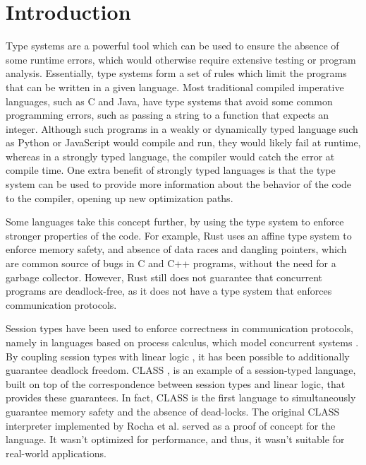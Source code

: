 
\section{Introduction}

Type systems are a powerful tool which can be used to ensure the absence of some runtime errors, which would otherwise require extensive testing or program analysis. Essentially, type systems form a set of rules which limit the programs that can be written in a given language. Most traditional compiled imperative languages, such as C and Java, have type systems that avoid some common programming errors, such as passing a string to a function that expects an integer. Although such programs in a weakly or dynamically typed language such as Python or JavaScript would compile and run, they would likely fail at runtime, whereas in a strongly typed language, the compiler would catch the error at compile time. One extra benefit of strongly typed languages is that the type system can be used to provide more information about the behavior of the code to the compiler, opening up new optimization paths.

Some languages take this concept further, by using the type system to enforce stronger properties of the code. For example, Rust \cite{Matsakis:2014} uses an affine type system to enforce memory safety, and absence of data races and dangling pointers, which are common source of bugs in C and C++ programs, without the need for a garbage collector. However, Rust still does not guarantee that concurrent programs are deadlock-free, as it does not have a type system that enforces communication protocols.


Session types \cite{Honda:1993,Honda:1998} have been used to enforce correctness in communication protocols, namely in languages based on process calculus, which model concurrent systems \cite{Milner:1980,Milner:1992:1,Milner:1992:2}. By coupling session types with linear logic \cite{Girard:1987,Caires:2010}, it has been possible to additionally guarantee deadlock freedom. CLASS \cite{Rocha:2022}, is an example of a session-typed language, built on top of the correspondence between session types and linear logic, that provides these guarantees. In fact, CLASS is the first language to simultaneously guarantee memory safety and the absence of dead-locks. The original CLASS interpreter implemented by Rocha et al. \cite{Rocha:2021:artifact} served as a proof of concept for the language. It wasn't optimized for performance, and thus, it wasn't suitable for real-world applications.

